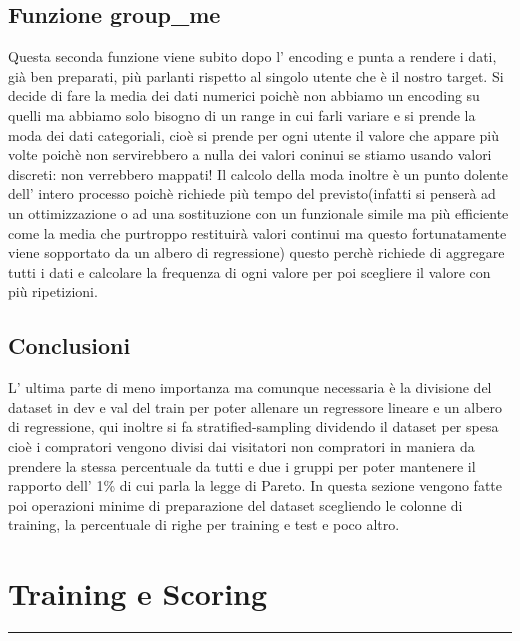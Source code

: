 \documentclass[11pt]{article}
\begin{document}
\subsection{Funzione group\_me}\label{funzione-group_me}

Questa seconda funzione viene subito dopo l' encoding e punta a rendere
i dati, già ben preparati, più parlanti rispetto al singolo utente che è
il nostro target. Si decide di fare la media dei dati numerici poichè
non abbiamo un encoding su quelli ma abbiamo solo bisogno di un range in
cui farli variare e si prende la moda dei dati categoriali, cioè si
prende per ogni utente il valore che appare più volte poichè non
servirebbero a nulla dei valori coninui se stiamo usando valori
discreti: non verrebbero mappati! Il calcolo della moda inoltre è un
punto dolente dell' intero processo poichè richiede più tempo del
previsto(infatti si penserà ad un ottimizzazione o ad una sostituzione
con un funzionale simile ma più efficiente come la media che purtroppo
restituirà valori continui ma questo fortunatamente viene sopportato da
un albero di regressione) questo perchè richiede di aggregare tutti i
dati e calcolare la frequenza di ogni valore per poi scegliere il valore
con più ripetizioni.

\subsection{Conclusioni}\label{conclusioni}

L' ultima parte di meno importanza ma comunque necessaria è la divisione
del dataset in dev e val del train per poter allenare un regressore
lineare e un albero di regressione, qui inoltre si fa
stratified-sampling dividendo il dataset per spesa cioè i compratori
vengono divisi dai visitatori non compratori in maniera da prendere la
stessa percentuale da tutti e due i gruppi per poter mantenere il
rapporto dell' 1\% di cui parla la legge di Pareto. In questa sezione
vengono fatte poi operazioni minime di preparazione del dataset
scegliendo le colonne di training, la percentuale di righe per training
e test e poco altro.

    \section{Training e Scoring}\label{training-e-scoring}

\begin{center}\rule{0.5\linewidth}{\linethickness}\end{center}
\end{document}
